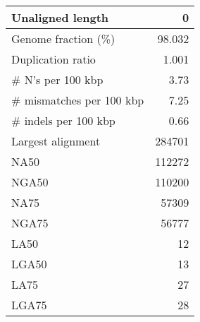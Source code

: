 \documentclass[12pt,a4paper]{article}
\begin{document}
\begin{table}[ht]
\begin{center}
\begin{tabular}{|l*{1}{|r}|}
Unaligned length & 0 \\ \hline
Genome fraction (\%) & 98.032 \\ \hline
Duplication ratio & 1.001 \\ \hline
\# N's per 100 kbp & 3.73 \\ \hline
\# mismatches per 100 kbp & 7.25 \\ \hline
\# indels per 100 kbp & 0.66 \\ \hline
Largest alignment & 284701 \\ \hline
NA50 & 112272 \\ \hline
NGA50 & 110200 \\ \hline
NA75 & 57309 \\ \hline
NGA75 & 56777 \\ \hline
LA50 & 12 \\ \hline
LGA50 & 13 \\ \hline
LA75 & 27 \\ \hline
LGA75 & 28 \\ \hline
\end{tabular}
\end{center}
\end{table}
\end{document}
